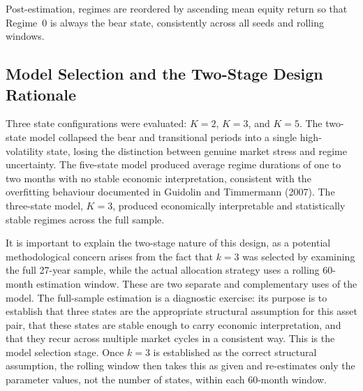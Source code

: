 \documentclass[12pt, a4paper]{article}
\begin{document}
Post-estimation, regimes are reordered by ascending mean equity return so that Regime~0 is always the bear state, consistently across all seeds and rolling windows.


\subsection{Model Selection and the Two-Stage Design Rationale}

Three state configurations were evaluated: $K=2$, $K=3$, and $K=5$. The two-state model
collapsed the bear and transitional periods into a single high-volatility state, losing the
distinction between genuine market stress and regime uncertainty. The five-state model
produced average regime durations of one to two months with no stable economic interpretation,
consistent with the overfitting behaviour documented in Guidolin and Timmermann (2007).
The three-state model, $K=3$, produced economically interpretable and statistically stable
regimes across the full sample.

It is important to explain the two-stage nature of this design, as a potential
methodological concern arises from the fact that $k=3$ was selected by examining the full
27-year sample, while the actual allocation strategy uses a rolling 60-month estimation
window. These are two separate and complementary uses of the model. The full-sample
estimation is a diagnostic exercise: its purpose is to establish that three states are the
appropriate structural assumption for this asset pair, that these states are stable enough
to carry economic interpretation, and that they recur across multiple market cycles in a
consistent way. This is the model selection stage. Once $k=3$ is established as the correct
structural assumption, the rolling window then takes this as given and re-estimates only the
parameter values, not the number of states, within each 60-month window.
\end{document}
